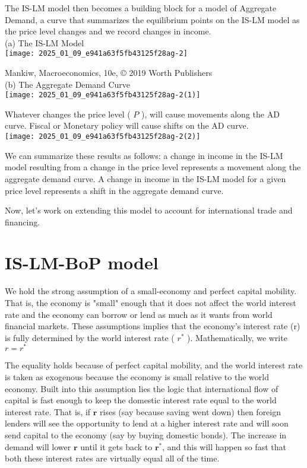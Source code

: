 \documentclass[10pt]{article}
\begin{document}
The IS-LM model then becomes a building block for a model of Aggregate Demand, a curve that summarizes the equilibrium points on the IS-LM model as the price level changes and we record changes in income.\\
(a) The IS-LM Model\\
\texttt{[image: 2025\_01\_09\_e941a63f5fb43125f28ag-2]}

Mankiw, Macroeconomics, 10e, © 2019 Worth Publishers\\
(b) The Aggregate Demand Curve\\
\texttt{[image: 2025\_01\_09\_e941a63f5fb43125f28ag-2(1)]}

Whatever changes the price level ( $P$ ), will cause movements along the AD curve. Fiscal or Monetary policy will cause shifts on the AD curve.\\
\texttt{[image: 2025\_01\_09\_e941a63f5fb43125f28ag-2(2)]}

We can summarize these results as follows: a change in income in the IS-LM model resulting from a change in the price level represents a movement along the aggregate demand curve. A change in income in the IS-LM model for a given price level represents a shift in the aggregate demand curve.

Now, let's work on extending this model to account for international trade and financing.

\section*{IS-LM-BoP model}
We hold the strong assumption of a small-economy and perfect capital mobility. That is, the economy is "small" enough that it does not affect the world interest rate and the economy can borrow or lend as much as it wants from world financial markets. These assumptions implies that the economy's interest rate (r) is fully determined by the world interest rate ( $r^{*}$ ). Mathematically, we write\\
$r=r^{*}$

The equality holds because of perfect capital mobility, and the world interest rate is taken as exogenous because the economy is small relative to the world economy. Built into this assumption lies the logic that international flow of capital is fast enough to keep the domestic interest rate equal to the world interest rate. That is, if $\mathbf{r}$ rises (say because saving went down) then foreign lenders will see the opportunity to lend at a higher interest rate and will soon send capital to the economy (say by buying domestic bonds). The increase in demand will lower $\mathbf{r}$ until it gets back to $\mathbf{r}^{*}$, and this will happen so fast that both these interest rates are virtually equal all of the time.
\end{document}
